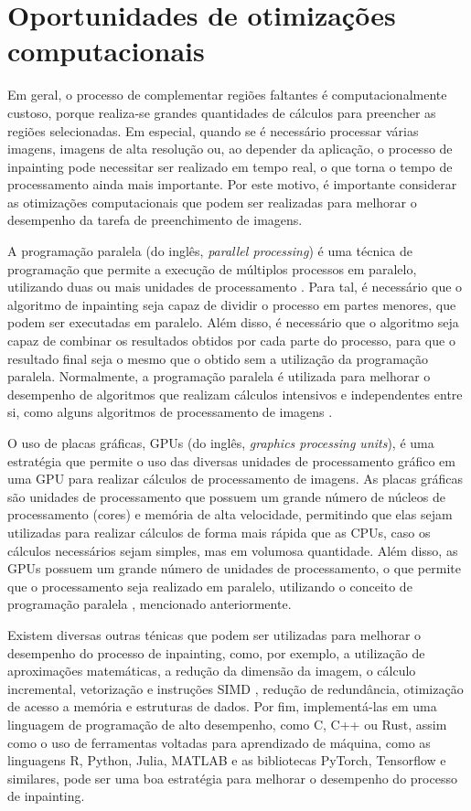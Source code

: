 
\section{Oportunidades de otimizações computacionais}

Em geral, o processo de complementar regiões faltantes é computacionalmente custoso, porque realiza-se grandes quantidades de cálculos para preencher as regiões selecionadas. Em especial, quando se é necessário processar várias imagens, imagens de alta resolução ou, ao depender da aplicação, o processo de inpainting pode necessitar ser realizado em tempo real, o que torna o tempo de processamento ainda mais importante. Por este motivo, é importante considerar as otimizações computacionais que podem ser realizadas para melhorar o desempenho da tarefa de preenchimento de imagens.

A programação paralela (do inglês, \emph{parallel processing}) é uma técnica de programação que permite a execução de múltiplos processos em paralelo, utilizando duas ou mais unidades de processamento \cite{tanenbaum2014os}. Para tal, é necessário que o algoritmo de inpainting seja capaz de dividir o processo em partes menores, que podem ser executadas em paralelo. Além disso, é necessário que o algoritmo seja capaz de combinar os resultados obtidos por cada parte do processo, para que o resultado final seja o mesmo que o obtido sem a utilização da programação paralela.
Normalmente, a programação paralela é utilizada para melhorar o desempenho de algoritmos que realizam cálculos intensivos e independentes entre si, como alguns algoritmos de processamento de imagens \cite{gonzalez2006image}.

O uso de placas gráficas, GPUs (do inglês, \emph{graphics processing units}), é uma estratégia que permite o uso das diversas unidades de processamento gráfico em uma GPU para realizar cálculos de processamento de imagens. As placas gráficas são unidades de processamento que possuem um grande número de núcleos de processamento (cores) e memória de alta velocidade, permitindo que elas sejam utilizadas para realizar cálculos de forma mais rápida que as CPUs, caso os cálculos necessários sejam simples, mas em volumosa quantidade. Além disso, as GPUs possuem um grande número de unidades de processamento, o que permite que o processamento seja realizado em paralelo, utilizando o conceito de programação paralela \cite{tanenbaum2014os}, mencionado anteriormente.

Existem diversas outras ténicas que podem ser utilizadas para melhorar o desempenho do processo de inpainting, como, por exemplo, a utilização de aproximações matemáticas, a redução da dimensão da imagem, o cálculo incremental, vetorização e instruções SIMD \cite{intel2022manual}, redução de redundância, otimização de acesso a memória e estruturas de dados. Por fim, implementá-las em uma linguagem de programação de alto desempenho, como C, C++ ou Rust, assim como o uso de ferramentas voltadas para aprendizado de máquina, como as linguagens R, Python, Julia, MATLAB e as bibliotecas PyTorch, Tensorflow \cite{tensorflow2015-whitepaper} e similares, pode ser uma boa estratégia para melhorar o desempenho do processo de inpainting.

